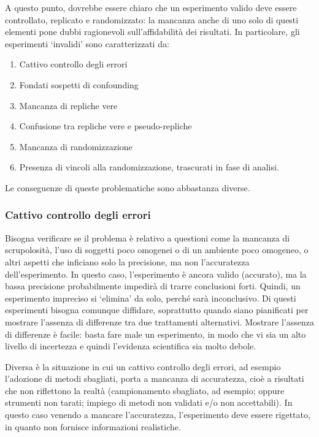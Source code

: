 \documentclass[a4paper,12pt,oneside]{book}
\providecommand{\tightlist}{%
  \setlength{\itemsep}{0pt}\setlength{\parskip}{0pt}}
\begin{document}
A questo punto, dovrebbe essere chiaro che un esperimento valido deve essere controllato, replicato e randomizzato: la mancanza anche di uno solo di questi elementi pone dubbi ragionevoli sull'affidabilità dei risultati. In particolare, gli esperimenti `invalidi' sono caratterizzati da:

\begin{enumerate}
\def\labelenumi{\arabic{enumi}.}
\tightlist
\item
  Cattivo controllo degli errori
\item
  Fondati sospetti di confounding
\item
  Mancanza di repliche vere
\item
  Confusione tra repliche vere e pseudo-repliche
\item
  Mancanza di randomizzazione
\item
  Presenza di vincoli alla randomizzazione, trascurati in fase di analisi.
\end{enumerate}

Le conseguenze di queste problematiche sono abbastanza diverse.

\hypertarget{cattivo-controllo-degli-errori}{%
\subsubsection{Cattivo controllo degli errori}\label{cattivo-controllo-degli-errori}}

Bisogna verificare se il problema è relativo a questioni come la mancanza di scrupolosità, l'uso di soggetti poco omogenei o di un ambiente poco omogeneo, o altri aspetti che inficiano solo la precisione, ma non l'accuratezza dell'esperimento. In questo caso, l'esperimento è ancora valido (accurato), ma la bassa precisione probabilmente impedirà di trarre conclusioni forti. Quindi, un esperimento impreciso si `elimina' da solo, perché sarà inconclusivo. Di questi esperimenti bisogna comunque diffidare, soprattutto quando siano pianificati per mostrare l'assenza di differenze tra due trattamenti alternativi. Mostrare l'assenza di differenze è facile: basta fare male un esperimento, in modo che vi sia un alto livello di incertezza e quindi l'evidenza scientifica sia molto debole.

Diversa è la situazione in cui un cattivo controllo degli errori, ad esempio l'adozione di metodi sbagliati, porta a mancanza di accuratezza, cioè a risultati che non riflettono la realtà (campionamento sbagliato, ad esempio; oppure strumenti non tarati; impiego di metodi non validati e/o non accettabili). In questo caso venendo a mancare l'accuratezza, l'esperimento deve essere rigettato, in quanto non fornisce informazioni realistiche.
\end{document}
